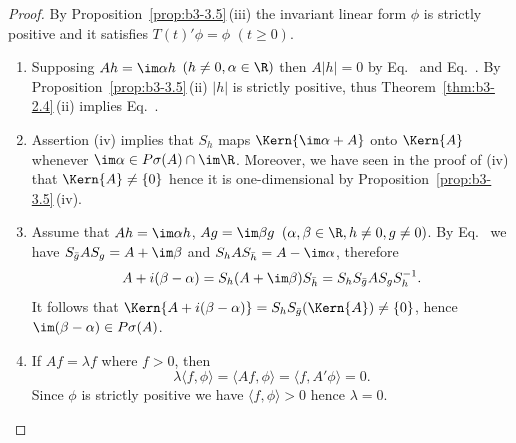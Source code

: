 \begin{proof}
	By Proposition~\ref{prop:b3-3.5}\,(iii) the invariant linear form $\phi$ is strictly positive and it satisfies $T(t)'\phi = \phi$ $(t \geq 0)$.
	\begin{enumerate}[wide, labelindent=.25em]
	\item[(iv)] 
	Supposing $Ah = \im\alpha h$ $(h \neq 0, \alpha \in \R)$ then $A|h| = 0$ by Eq.~ and Eq.~.
	By Proposition~\ref{prop:b3-3.5}\,(ii) $|h|$ is strictly positive, thus Theorem~\ref{thm:b3-2.4}\,(ii) implies Eq.~.
	
	\item[(ii)] 
	Assertion (iv) implies that $S_{h}$ maps $\Kern{\im\alpha + A}$ onto $\Kern{A}$ whenever $\im \alpha \in P\sigma(A)\cap \im\R$.
	Moreover, we have seen in the proof of (iv) that $\Kern{A} \neq \{0\}$ hence it is one-dimensional by Proposition~\ref{prop:b3-3.5}\,(iv).
	
	\item[(i)] 
	Assume that $Ah = \im\alpha h$, $Ag = \im\beta g$ $(\alpha,\beta \in \R, h \neq 0, g \neq 0)$.
	By Eq.~ we have $S_{\bar{g}}A S_{g} = A + \im\beta$ and $S_{h}A S_{\bar{h}} = A - \im\alpha$, therefore
	\begin{equation}\label{eq:b3-3.6}
	A + i(\beta - \alpha) = S_{h}(A + \im\beta)S_{\bar{h}} = S_{h}S_{\bar{g}}A S_{g}S_{h}^{-1}.
	\end{equation}
	It follows that $\Kern{A + i(\beta - \alpha)} = S_{h}S_{\bar{g}}(\Kern{A}) \neq \{0\}$, hence $\im (\beta - \alpha) \in P\sigma(A)$.
	
	\item[(v)] 
	If\/ $Af = \lambda f$ where $f > 0$, then
	\begin{equation}\label{eq:b3-3.7}
	\lambda\langle f,\phi\rangle = \langle Af,\phi\rangle = \langle f,A'\phi\rangle = 0.
	\end{equation}
	Since $\phi$ is strictly positive we have $\langle f,\phi\rangle > 0$ hence $\lambda = 0$.
	

\end{enumerate}
\end{proof}

